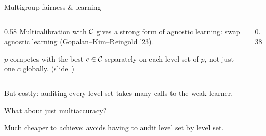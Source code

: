 \begin{frame}{Multigroup fairness \& learning}
  \begin{columns}[c]
    \begin{column}{0.58\textwidth}
      Multicalibration with $\mathcal{C}$ gives a strong form of agnostic learning:
      \alert{swap agnostic learning}
      \textcolor{muted}{(Gopalan--Kim--Reingold '23)}.

      \vspace{0.4em}
      $p$ competes with the best $c \in \mathcal{C}$ \alert{separately on each
      level set} of $p$, not just one $c$ globally.
      \textcolor{muted}{(slide~)}
    \end{column}
    \begin{column}{0.38\textwidth}
      \centering
    \end{column}
  \end{columns}

  \vspace{0.6em}
  But \alert{costly}: auditing every level set takes many calls
  to the weak learner.

  \pause
  \vspace{1.5em}
  \alert{What about just multiaccuracy?}

  \alert{Much cheaper} to achieve: avoids having to audit level set by level set.
\end{frame}
